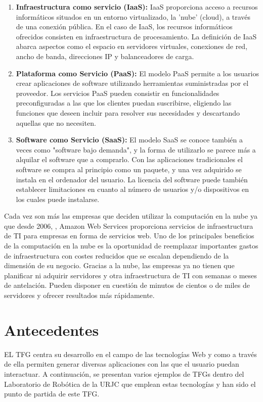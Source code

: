 \begin{enumerate}
     \item \textbf{Infraestructura como servicio (IaaS): } IaaS proporciona acceso a recursos informáticos situados en un entorno virtualizado, la 'nube' (cloud), a través de una conexión pública. En el caso de IaaS, los recursos informáticos ofrecidos consisten en infraestructura de procesamiento. La definición de IaaS abarca aspectos como el espacio en servidores virtuales, conexiones de red, ancho de banda, direcciones IP y balanceadores de carga.
    \item \textbf{Plataforma como Servicio (PaaS): }El modelo PaaS permite a los usuarios crear aplicaciones de software utilizando herramientas suministradas por el proveedor. Los servicios PaaS pueden consistir en funcionalidades preconfiguradas a las que los clientes puedan suscribirse, eligiendo las funciones que deseen incluir para resolver sus necesidades y descartando aquellas que no necesiten.
    \item \textbf{Software como Servicio (SaaS): } El modelo SaaS se conoce también a veces como "software bajo demanda", y la forma de utilizarlo se parece más a alquilar el software que a comprarlo. Con las aplicaciones tradicionales el software se compra al principio como un paquete, y una vez adquirido se instala en el ordenador del usuario. La licencia del software puede también establecer limitaciones en cuanto al número de usuarios y/o dispositivos en los cuales puede instalarse.

\end{enumerate}

Cada vez son más las empresas que deciden utilizar la computación en la nube ya que desde 2006, , Amazon Web Services proporciona servicios de infraestructura de TI para empresas en forma de servicios web.
Uno de los principales beneficios de la computación en la nube es la oportunidad de reemplazar importantes gastos de infraestructura con costes reducidos que se escalan dependiendo de la dimensión de su negocio.
Gracias a la nube, las empresas ya no tienen que planificar ni adquirir servidores y otra infraestructura de TI con semanas o meses de antelación. Pueden disponer en cuestión de minutos de cientos o de miles de servidores y ofrecer resultados más rápidamente.

\section{Antecedentes}
EL TFG centra su desarrollo en el campo de las tecnologías Web y como a través de ella permiten generar diversas aplicaciones con las que el usuario puedan interactuar. A continuación, se presentan varios ejemplos de TFGs dentro del Laboratorio de Robótica de la URJC que emplean estas tecnologías y han sido el punto de partida de este TFG.

